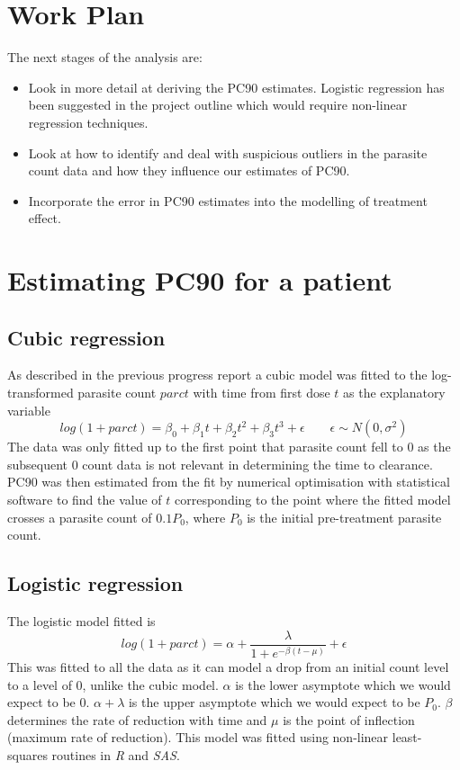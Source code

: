 \section{Work Plan}
The next stages of the analysis are:
\begin{itemize}
\item Look in more detail at deriving the PC90 estimates. Logistic regression has been suggested in the project outline which would require non-linear regression techniques.
\item Look at how to identify and deal with suspicious outliers in the parasite count data and how they influence our estimates of PC90.
\item Incorporate the error in PC90 estimates into the modelling of treatment effect.
\end{itemize}

\section{Estimating PC90 for a patient}
\subsection{Cubic regression}
As described in the previous progress report a cubic model was fitted to the log-transformed parasite count $parct$ with time from first dose $t$ as the explanatory variable
$$log(1+parct)=\beta_0+\beta_1t+\beta_2t^2+\beta_3t^3+\epsilon\quad\quad\epsilon\sim N(0,\sigma^2)$$
The data was only fitted up to the first point that parasite count fell to 0 as the subsequent 0 count data is not relevant in determining the time to clearance. PC90 was then estimated from the fit by numerical optimisation with statistical software to find the value of $t$ corresponding to the point where the fitted model crosses a parasite count of $0.1P_0$, where $P_0$ is the initial pre-treatment parasite count.
\subsection{Logistic regression}
The logistic model fitted is
$$log(1+parct)=\alpha+\frac{\lambda}{1+e^{-\beta(t-\mu)}}+\epsilon$$
This was fitted to all the data as it can model a drop from an initial count level to a level of 0, unlike the cubic model. $\alpha$ is the lower asymptote which we would expect to be 0. $\alpha+\lambda$ is the upper asymptote which we would expect to be $P_0$. $\beta$ determines the rate of reduction with time and $\mu$ is the point of inflection (maximum rate of reduction). This model was fitted using non-linear least-squares routines in \emph{R} and \emph{SAS}.

